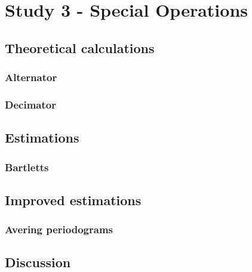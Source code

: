 
\section{Study 3 - Special Operations}


\subsection{Theoretical calculations}


\subsubsection{Alternator}


\subsubsection{Decimator}


\subsection{Estimations}


\subsubsection{Bartletts}


\subsection{Improved estimations}


\subsubsection{Avering periodograms}


\subsection{Discussion}

